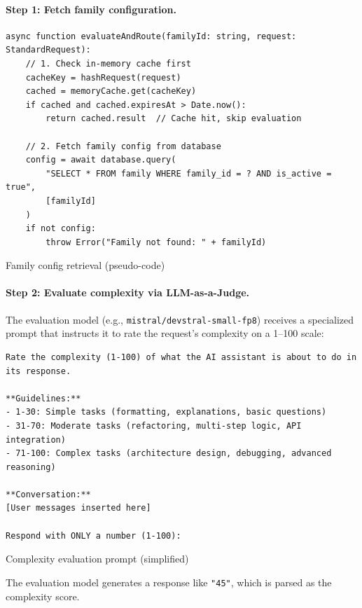 \documentclass[english]{article}
\begin{document}
\paragraph{Step 1: Fetch family configuration.}

\begin{listing}[H]
\begin{verbatim}
async function evaluateAndRoute(familyId: string, request: StandardRequest):
    // 1. Check in-memory cache first
    cacheKey = hashRequest(request)
    cached = memoryCache.get(cacheKey)
    if cached and cached.expiresAt > Date.now():
        return cached.result  // Cache hit, skip evaluation

    // 2. Fetch family config from database
    config = await database.query(
        "SELECT * FROM family WHERE family_id = ? AND is_active = true",
        [familyId]
    )
    if not config:
        throw Error("Family not found: " + familyId)
\end{verbatim}
\caption{Family config retrieval (pseudo-code)}
\end{listing}

\paragraph{Step 2: Evaluate complexity via LLM-as-a-Judge.}

The evaluation model (e.g., \texttt{mistral/devstral-small-fp8}) receives a specialized prompt that instructs it to rate the request's complexity on a 1--100 scale:

\begin{listing}[H]
\begin{verbatim}
Rate the complexity (1-100) of what the AI assistant is about to do in its response.

**Guidelines:**
- 1-30: Simple tasks (formatting, explanations, basic questions)
- 31-70: Moderate tasks (refactoring, multi-step logic, API integration)
- 71-100: Complex tasks (architecture design, debugging, advanced reasoning)

**Conversation:**
[User messages inserted here]

Respond with ONLY a number (1-100):
\end{verbatim}
\caption{Complexity evaluation prompt (simplified)}
\end{listing}

The evaluation model generates a response like \texttt{"45"}, which is parsed as the complexity score.
\end{document}
